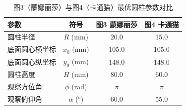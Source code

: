 \begin{table}[H]
\centering
\caption{图3（蒙娜丽莎）与图4（卡通猫）最优圆柱参数对比}\label{tab:param_optimal}
\begin{tabular}{lccc}
\toprule
参数 & 符号 & 图3 蒙娜丽莎 & 图4 卡通猫\\
\midrule
圆柱半径 & $R$ (mm) & 20.0 & 15.0\\
底面圆心横坐标 & $x_0$ (mm) & 105.0 & 105.0\\
底面圆心纵坐标 & $y_0$ (mm) & 148.0 & 148.0\\
圆柱高度 & $H$ (mm) & 80.0 & 60.0\\
观察方位角 & $\phi$ (rad) & $\pi$ & $\pi$\\
观察俯仰角 & $\alpha$ (°) & 60.0 & 55.0\\
\bottomrule
\end{tabular}
\end{table}
